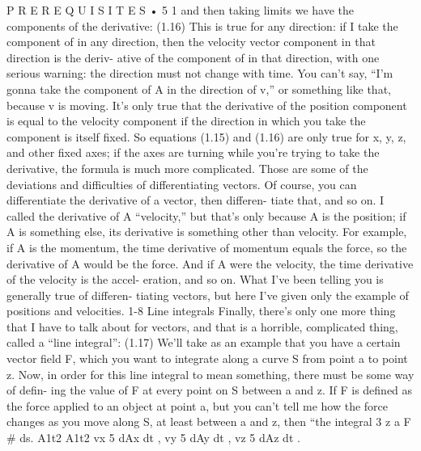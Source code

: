 \documentclass[10pt,oneside]{article}
\begin{document}
P R E R E Q U I S I T E S • 5 1 and then taking limits we have the components of the derivative: (1.16) This is true for any direction: if I take the component of in any direction, then the velocity vector component in that direction is the deriv- ative of the component of in that direction, with one serious warning: the direction must not change with time. You can’t say, “I’m gonna take the component of A in the direction of v,” or something like that, because v is moving. It’s only true that the derivative of the position component is equal to the velocity component if the direction in which you take the component is itself fixed. So equations (1.15) and (1.16) are only true for x, y, z, and other fixed axes; if the axes are turning while you’re trying to take the derivative, the formula is much more complicated. Those are some of the deviations and difficulties of differentiating vectors. Of course, you can differentiate the derivative of a vector, then differen- tiate that, and so on. I called the derivative of A “velocity,” but that’s only because A is the position; if A is something else, its derivative is something other than velocity. For example, if A is the momentum, the time derivative of momentum equals the force, so the derivative of A would be the force. And if A were the velocity, the time derivative of the velocity is the accel- eration, and so on. What I’ve been telling you is generally true of differen- tiating vectors, but here I’ve given only the example of positions and velocities. 1-8 Line integrals Finally, there’s only one more thing that I have to talk about for vectors, and that is a horrible, complicated thing, called a “line integral”: (1.17) We’ll take as an example that you have a certain vector field F, which you want to integrate along a curve S from point a to point z. Now, in order for this line integral to mean something, there must be some way of defin- ing the value of F at every point on S between a and z. If F is defined as the force applied to an object at point a, but you can’t tell me how the force changes as you move along S, at least between a and z, then “the integral 3 z a F \# ds. A1t2 A1t2 vx 5 dAx dt , vy 5 dAy dt , vz 5 dAz dt .\par
\end{document}
